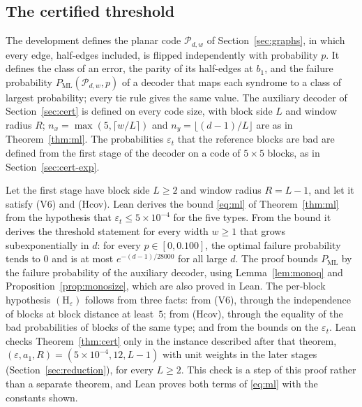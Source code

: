 \documentclass[11pt]{amsart}
\theoremstyle{definition}
\theoremstyle{remark}
\numberwithin{equation}{section}
\newcommand{\PML}{P_{\mathrm{ML}}}
\begin{document}
\subsection{The certified threshold}\label{sec:lean-ml}
The development defines the planar code $\mathcal P_{d,w}$ of Section~\ref{sec:graphs}, in which every edge, half-edges included, is flipped independently with probability $p$. It defines the class of an error, the parity of its half-edges at $b_1$, and the failure probability $\PML(\mathcal P_{d,w},p)$ of a decoder that maps each syndrome to a class of largest probability; every tie rule gives the same value. The auxiliary decoder of Section~\ref{sec:cert} is defined on every code size, with block side $L$ and window radius $R$; $n_x=\max(5,\lceil w/L\rceil)$ and $n_y=\lfloor (d-1)/L\rfloor$ are as in Theorem~\ref{thm:ml}. The probabilities $\varepsilon_t$ that the reference blocks are bad are defined from the first stage of the decoder on a code of $5\times5$ blocks, as in Section~\ref{sec:cert-exp}.

Let the first stage have block side $L\ge2$ and window radius $R=L-1$, and let it satisfy (V6) and (Hcov). Lean derives the bound \eqref{eq:ml} of Theorem~\ref{thm:ml} from the hypothesis that $\varepsilon_t\le5\times10^{-4}$ for the five types. From the bound it derives the threshold statement for every width $w\ge1$ that grows subexponentially in $d$: for every $p\in[0,0.100]$, the optimal failure probability tends to $0$ and is at most $e^{-(d-1)/28000}$ for all large $d$. The proof bounds $\PML$ by the failure probability of the auxiliary decoder, using Lemma~\ref{lem:monoq} and Proposition~\ref{prop:monosize}, which are also proved in Lean. The per-block hypothesis $(\mathrm H_\varepsilon)$ follows from three facts: from (V6), through the independence of blocks at block distance at least~$5$; from (Hcov), through the equality of the bad probabilities of blocks of the same type; and from the bounds on the $\varepsilon_t$. Lean checks Theorem~\ref{thm:cert} only in the instance described after that theorem, $(\varepsilon,a_1,R)=(5\times10^{-4},12,L-1)$ with unit weights in the later stages (Section~\ref{sec:reduction}), for every $L\ge2$. This check is a step of this proof rather than a separate theorem, and Lean proves both terms of \eqref{eq:ml} with the constants shown.
\end{document}
